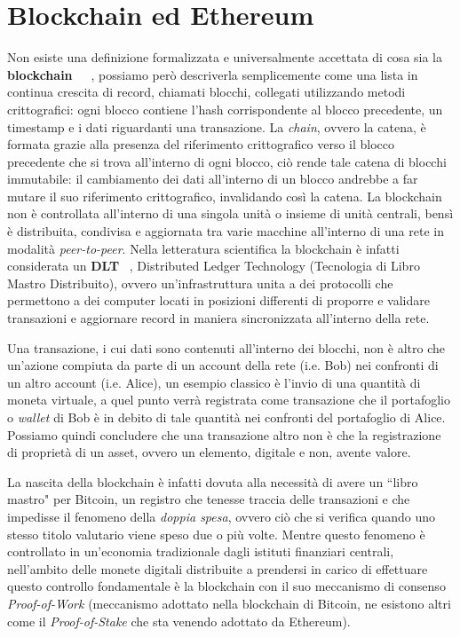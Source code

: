 \section{Blockchain ed Ethereum}
\label{sub:bc}
Non esiste una definizione formalizzata e universalmente accettata di cosa sia la
\textbf{blockchain}~\cite{block1}~\cite{block2}~\cite{block3}, possiamo però descriverla semplicemente come una lista in continua 
crescita di record, chiamati blocchi, collegati utilizzando metodi crittografici: 
ogni blocco contiene l'hash corrispondente al blocco precedente, un timestamp e i 
dati riguardanti una transazione. 
La \emph{chain}, ovvero la catena, è formata grazie alla presenza del riferimento 
crittografico verso il blocco precedente che si trova all'interno di ogni blocco, 
ciò rende tale catena di blocchi immutabile: il cambiamento dei dati all'interno di 
un blocco andrebbe a far mutare il suo riferimento crittografico, invalidando così la catena.
La blockchain non è controllata all'interno di una singola unità o insieme di 
unità centrali, bensì è distribuita, condivisa e aggiornata tra varie macchine 
all'interno di una rete in modalità \emph{peer-to-peer}.
Nella letteratura scientifica la blockchain è infatti considerata un \textbf{DLT} ~\cite{asv-bdg-19},
Distributed Ledger Technology (Tecnologia di Libro Mastro Distribuito), ovvero
un'infrastruttura unita a dei protocolli che permettono a dei computer locati in
posizioni differenti di proporre e validare transazioni e aggiornare record in maniera
sincronizzata all'interno della rete.

Una transazione, i cui dati sono contenuti all'interno dei blocchi, non è 
altro che un'azione compiuta da parte di un account della rete (i.e. Bob) nei confronti 
di un altro account (i.e. Alice), un esempio classico è l'invio di una quantità di moneta 
virtuale, a quel punto verrà registrata come transazione che il portafoglio o \emph{wallet}
di Bob è in debito di tale quantità nei confronti del portafoglio di Alice.
Possiamo quindi concludere che una transazione altro non è che la registrazione di proprietà 
di un asset, ovvero un elemento, digitale e non, avente valore.

La nascita della blockchain è infatti dovuta alla necessità di avere un ``libro mastro" per 
Bitcoin, un registro che tenesse traccia delle transazioni e che impedisse il fenomeno della 
\emph{doppia spesa}, ovvero ciò che si verifica quando uno stesso titolo valutario viene speso 
due o più volte. Mentre questo fenomeno è controllato in un'economia tradizionale dagli 
istituti finanziari centrali, nell'ambito delle monete digitali distribuite a prendersi 
in carico di effettuare questo controllo fondamentale è la blockchain con il suo 
meccanismo di consenso \emph{Proof-of-Work} 
(meccanismo adottato nella blockchain di Bitcoin, 
ne esistono altri come il \emph{Proof-of-Stake} che sta venendo adottato da Ethereum).

